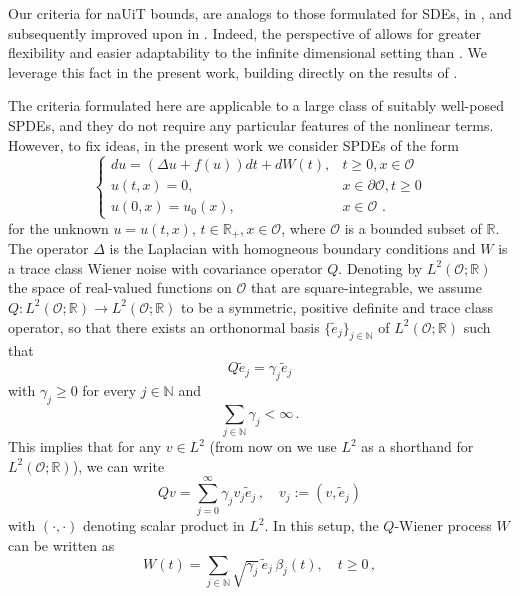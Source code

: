 \documentclass[reqno, 11pt]{amsart}
\theoremstyle{plain}
\theoremstyle{definition}
\theoremstyle{remark}
\numberwithin{equation}{section}
\numberwithin{theorem}{section}
\newcommand{\R}{\mathbb{R}}
\newcommand{\N}{\mathbb{N}}
\begin{document}
{Our criteria for naUiT bounds, are analogs to those formulated for SDEs,  in \cite[Proposition 2.2]{Angeli}, and subsequently improved upon in  \cite{schuh2024conditions}. Indeed, the perspective of \cite{schuh2024conditions} allows for greater flexibility and easier adaptability to the infinite dimensional setting than \cite{Angeli}.  We leverage this fact in the present work, building directly on the results of \cite{schuh2024conditions}. 

The criteria formulated here are applicable to a large class of suitably well-posed SPDEs, and they do not require any particular features of the  nonlinear terms.  However,  to fix ideas, in the present work we consider SPDEs of the form 
\begin{equation}\label{eqn:SPDEintro}
\left\{
\begin{array}{ll}
du= \left(\Delta u  + f(u)\right) dt+  dW(t), & t\geq 0, x\in \mathcal O\\
u(t,x)=0, & x \in \partial \mathcal O, t\geq 0\\
u(0,x)= u_0(x), & x \in \mathcal O\, \,.
\end{array}
\right.
\end{equation}
for the unknown $u=u(t,x), \, t \in \R_+, x\in \mathcal O$, where $\mathcal O$ is a bounded subset of  $\R$.  The operator  $\Delta$ is the Laplacian with homogneous boundary conditions and $W$ is a trace class Wiener noise with covariance operator $Q$. Denoting by $L^2(\mathcal O; \R)$ the space of real-valued functions on $\mathcal O$ that are square-integrable,  we assume $Q:L^2(\mathcal O;\R)\rightarrow L^2(\mathcal O;\R)$ to be a symmetric, positive definite and trace class operator, so that there exists an orthonormal basis $\{\tilde{e}_j\}_{j \in \N}$ of $L^2(\mathcal O;\R)$ such that 
\begin{equation}
    Q \tilde e_j = \gamma_j \tilde e_j
\end{equation}
 with $\gamma_j \geq  0$ for every $j \in \mathbb N$ and 
 $$
 \sum_{j \in \N} \gamma_j < \infty \,.
 $$
 This implies that for any $v \in L^2$ (from now on we use $L^2$ as a shorthand for $L^2(\mathcal O; \R)$),  we can write 
$$
Q v= \sum_{j=0}^{\infty}  \gamma_j v_j \tilde{e}_j \,, \quad v_j:=(v, \tilde{e}_j)
$$
with $(\cdot, \cdot)$ denoting scalar product in $L^2$. In this setup, the $Q$-Wiener process $W$ can be written as 
\begin{equation}\label{eqn: Q wiener process definition}
W(t) = \sum_{j \in \N} \sqrt{\gamma_j}\, \tilde{e}_j \, \beta_j(t), \quad t\geq 0  \, ,

\end{equation}}
\end{document}
